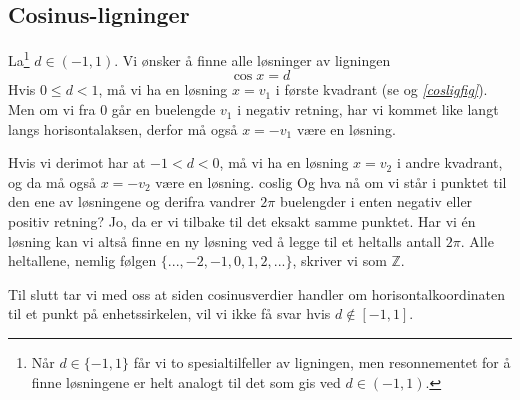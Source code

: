 \subsection{Cosinus-ligninger}
La\footnote{Når $ {d\in\{-1, 1\}} $ får vi to spesialtilfeller av ligningen, men resonnementet for å finne løsningene er helt analogt til det som gis ved $ {d\in(-1, 1)} $.} $ {d\in(-1, 1)} $. Vi ønsker å finne alle løsninger av ligningen
\[ \cos x=d \label{cosslig} \]
Hvis $ {0\leq d <1}$, må vi ha en løsning $ {x=v_1} $ i første kvadrant (se  og \textsl{\ref{cosligfig}}). Men om vi fra 0 går en buelengde $ v_1 $ i negativ retning, har vi kommet like langt langs horisontalaksen, derfor må også $ {x=-v_1} $ være en løsning.\vsk

Hvis vi derimot har at $ {-1< d<0} $, må vi ha en løsning $ {x=v_2} $ i andre kvadrant, og da må også ${ x=-v_2} $ være en løsning.
{coslig}
Og hva nå om vi står i punktet til den ene av løsningene og derifra vandrer $ 2\pi $ buelengder i enten negativ eller positiv retning? Jo, da er vi tilbake til det eksakt samme punktet. Har vi én løsning kan vi altså finne en ny løsning ved å legge til et heltalls antall $ 2\pi $. Alle heltallene, nemlig følgen $ \{...,-2, -1, 0, 1, 2, ... \} $, skriver vi som $ \mathbb{Z} $.\vsk

Til slutt tar vi med oss at siden cosinusverdier handler om horisontalkoordinaten til et punkt på enhetssirkelen, vil vi ikke få svar hvis $ {d\not \in [-1,1]} $.\regv

